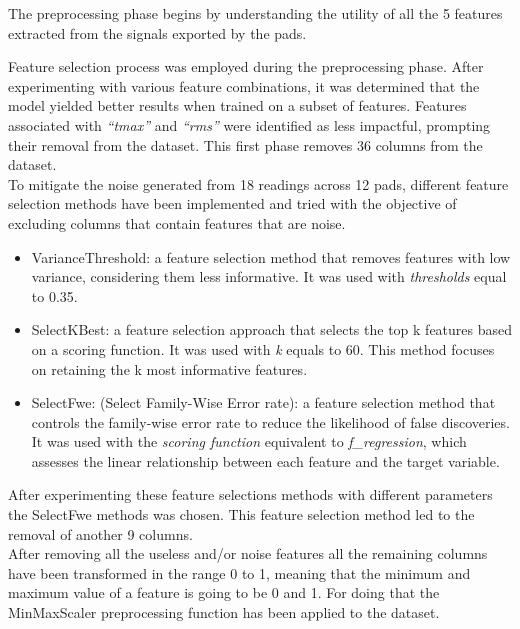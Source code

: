 \documentclass[conference]{IEEEtran}
\begin{document}
The preprocessing phase begins by understanding the utility of all the 5 features extracted 
from the signals exported by the pads.

Feature selection process was employed during the preprocessing phase. After experimenting with 
various feature combinations, it was determined that the model yielded better results when 
trained on a subset of features. \cite{OpenAI_ChatGPT_help_me_on_this}
Features associated with \textit{“tmax”} and \textit{“rms”} were identified as less impactful, 
prompting their removal from the dataset.
This first phase removes 36 columns from the dataset.\\

To mitigate the noise generated from 18 readings across 12 pads, different feature 
selection methods have been implemented and tried with the objective of excluding 
columns that contain features that are noise.

\begin{itemize}
    \item VarianceThreshold: a feature selection method that removes features with low variance, 
    considering them less informative. It was used with \textit{thresholds} equal to 0.35.
    \item SelectKBest: a feature selection approach that selects the top k features based on a scoring function. 
    It was used with \textit{k} equals to 60. This method focuses on retaining the k most informative features.
    \item SelectFwe: (Select Family-Wise Error rate): a feature selection method 
    that controls the family-wise error rate to reduce the likelihood of false discoveries. 
    It was used with the \textit{scoring function} equivalent to \textit{f\_regression}, which assesses the linear 
    relationship between each feature and the target variable. \cite{OpenAI_ChatGPT_help_me_on_this}
\end{itemize}

After experimenting these feature selections methods with different parameters the SelectFwe methods 
was chosen. This feature selection method led to the removal of another 9 columns.\\

After removing all the useless and/or noise features all the remaining columns have been transformed 
in the range 0 to 1, meaning that the minimum and maximum value of a feature is going to be 0 and 1. 
For doing that the MinMaxScaler preprocessing function has been applied to the dataset.
\end{document}
